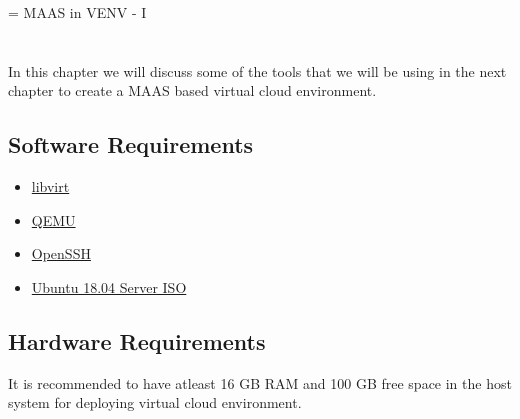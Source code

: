 \chapname = {MAAS in VENV - I}
\chapter{\the\chapname}

In this chapter we will discuss some of the tools that we will be using in the next chapter to create a MAAS based virtual cloud environment.

\section{Software Requirements}

\begin{itemize}
    \setlength\itemsep{-1em}
    \item \href{https://libvirt.org/}{libvirt}
    \item \href{https://www.qemu.org/}{QEMU}
    \item \href{https://www.openssh.com/}{OpenSSH}
    \item \href{http://releases.ubuntu.com/18.04.3/ubuntu-18.04.3-live-server-amd64.iso}{Ubuntu 18.04 Server ISO}
\end{itemize}
\section{Hardware Requirements}

It is recommended to have atleast 16 GB RAM and 100 GB free space in the host system for deploying virtual cloud environment.
